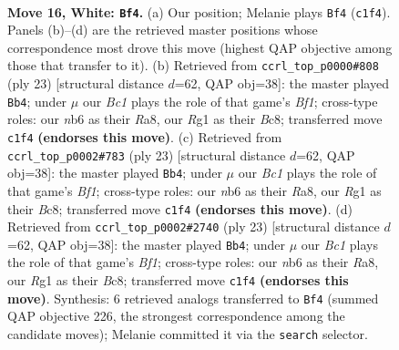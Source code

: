 \documentclass[11pt]{article}
\begin{document}
\clearpage

\begin{figure}[p]\centering
\begin{subfigure}{0.46\textwidth}\centering
\resizebox{\linewidth}{!}{%
\newchessgame
\chessboard[
  setfen={2kr2r1/1pp1ppbp/1n4p1/p3n3/7P/NB3P2/PPP1KP2/R1B3R1 w - - 0 16},
  showmover=false,
  pgfstyle=straightmove, color=movearrow, markmove={c1-f4}
]}
\caption{}
\end{subfigure}\hfill
\begin{subfigure}{0.46\textwidth}\centering
\resizebox{\linewidth}{!}{%
\newchessgame
\chessboard[
  setfen={r1b1kb1r/ppp2ppp/2p3n1/4P3/8/2N1BN1P/PPP2PP1/R2R2K1 b - - 4 12},
  showmover=false,
  pgfstyle=straightmove, color=movearrow, markmove={f8-b4}
]}
\caption{}
\end{subfigure}
\\[4pt]
\begin{subfigure}{0.46\textwidth}\centering
\resizebox{\linewidth}{!}{%
\newchessgame
\chessboard[
  setfen={r1b1kb1r/ppp2ppp/2p3n1/4P3/8/2N1BN1P/PPP2PP1/R2R2K1 b - - 0 12},
  showmover=false,
  pgfstyle=straightmove, color=movearrow, markmove={f8-b4}
]}
\caption{}
\end{subfigure}\hfill
\begin{subfigure}{0.46\textwidth}\centering
\resizebox{\linewidth}{!}{%
\newchessgame
\chessboard[
  setfen={r1b1kb1r/ppp2ppp/2p3n1/4P3/8/2N1BN1P/PPP2PP1/R2R2K1 b - - 2 12},
  showmover=false,
  pgfstyle=straightmove, color=movearrow, markmove={f8-b4}
]}
\caption{}
\end{subfigure}
\caption{\textbf{Move 16, White: \texttt{Bf4}.} (a) Our position; Melanie plays \texttt{Bf4} (\texttt{c1f4}). Panels (b)--(d) are the retrieved master positions whose correspondence most drove this move (highest QAP objective among those that transfer to it). (b) Retrieved from \texttt{ccrl\_top\_p0000\#808} (ply 23) [structural distance $d$=62, QAP obj=38]: the master played \texttt{Bb4}; under $\mu$ our \emph{Bc1} plays the role of that game's \emph{Bf1}; cross-type roles: our \emph{n}b6 as their \emph{R}a8, our \emph{R}g1 as their \emph{B}c8; transferred move \texttt{c1f4} \textbf{(endorses this move)}. (c) Retrieved from \texttt{ccrl\_top\_p0002\#783} (ply 23) [structural distance $d$=62, QAP obj=38]: the master played \texttt{Bb4}; under $\mu$ our \emph{Bc1} plays the role of that game's \emph{Bf1}; cross-type roles: our \emph{n}b6 as their \emph{R}a8, our \emph{R}g1 as their \emph{B}c8; transferred move \texttt{c1f4} \textbf{(endorses this move)}. (d) Retrieved from \texttt{ccrl\_top\_p0002\#2740} (ply 23) [structural distance $d$=62, QAP obj=38]: the master played \texttt{Bb4}; under $\mu$ our \emph{Bc1} plays the role of that game's \emph{Bf1}; cross-type roles: our \emph{n}b6 as their \emph{R}a8, our \emph{R}g1 as their \emph{B}c8; transferred move \texttt{c1f4} \textbf{(endorses this move)}. Synthesis: 6 retrieved analogs transferred to \texttt{Bf4} (summed QAP objective 226, the strongest correspondence among the candidate moves); Melanie committed it via the \texttt{search} selector.}
\label{fig:thought-m30}
\end{figure}
\end{document}
